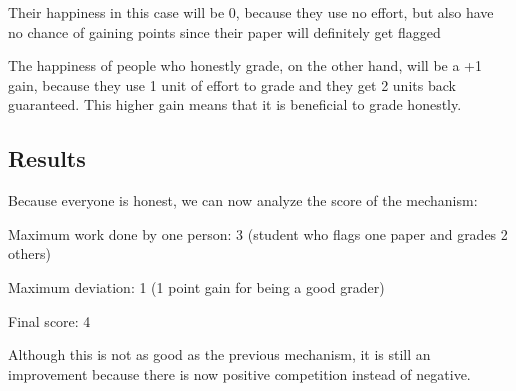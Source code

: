 \documentclass[12pt, Arial]{article}
\begin{document}
Their happiness in this case will be 0, because they use no effort, but also have no chance of gaining points since their paper will definitely get flagged

The happiness of people who honestly grade, on the other hand, will be a +1 gain, because they use 1 unit of effort to grade and they get 2 units back guaranteed. This higher gain means that it is beneficial to grade honestly.

\subsection{Results}
Because everyone is honest, we can now analyze the score of the mechanism:

Maximum work done by one person: 3 (student who flags one paper and grades 2 others)

Maximum deviation: 1 (1 point gain for being a good grader)

Final score: 4

Although this is not as good as the previous mechanism, it is still an improvement because there is now positive competition instead of negative.
\end{document}
